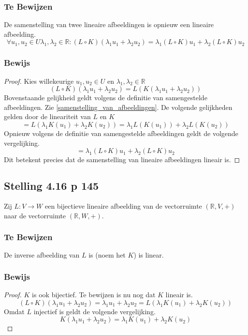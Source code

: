 \documentclass[lineaire_algebra_oplossingen.tex]{subfiles}
\begin{document}
\subsubsection*{Te Bewijzen}
De samenstelling van twee lineaire afbeeldingen is opnieuw een lineaire afbeelding.
\[
\forall u_1,u_2\in U \lambda_1,\lambda_2\in\mathbb{R}: (L\circ K)(\lambda_1u_1 + \lambda_2u_2) = \lambda_1(L\circ K)u_1 + \lambda_2(L\circ K)u_2
\]
\subsubsection*{Bewijs}
\begin{proof}
Kies willekeurige $u_1,u_2\in U$ en $\lambda_1,\lambda_2\in\mathbb{R}$
\[
(L\circ K)(\lambda_1u_1 + \lambda_2u_2) = L(K(\lambda_1u_1 + \lambda_2u_2))
\]
Bovenstaande gelijkheid geldt volgens de definitie van samengestelde afbeeldingen. Zie \ref{samenstelling_van_afbeeldingen}. De volgende gelijkheden gelden door de lineariteit van $L$ en $K$
\[
= L(\lambda_1K(u_1) + \lambda_2K(u_2)) = \lambda_1L(K(u_1)) + \lambda_2L(K(u_2))
\]
Opnieuw volgens de definitie van samengestelde afbeeldingen geldt de volgende vergelijking.
\[
= \lambda_1(L\circ K)u_1 + \lambda_2(L\circ K)u_2
\]
Dit betekent precies dat de samenstelling van lineaire afbeeldingen lineair is.
\end{proof}

\subsection{Stelling 4.16 p 145}
Zij $L:V\rightarrow W$ een bijectieve lineaire afbeelding van de vectorruimte $(\mathbb{R},V,+)$ naar de vectorruimte $(\mathbb{R},W,+)$.
\subsubsection*{Te Bewijzen}
De inverse afbeelding van $L$ is (noem het $K$) is linear.
\subsubsection*{Bewijs}
\begin{proof}
$K$ is ook bijectief. Te bewijzen is nu nog dat $K$ lineair is.
\[
(L\circ K)(\lambda_1u_1 + \lambda_2u_2) = \lambda_1u_1 + \lambda_2u_2 = L(\lambda_1K(u_1) + \lambda_2K(u_2))
\]
Omdat $L$ injectief is geldt de volgende vergelijking.
\[
K(\lambda_1u_1 + \lambda_2u_2) = \lambda_1K(u_1) + \lambda_2K(u_2)
\]
\end{proof}
\end{document}

